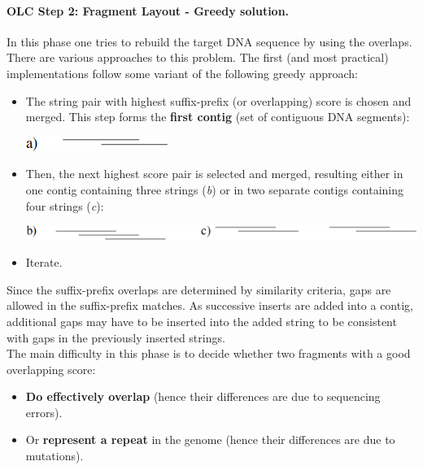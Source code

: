 \paragraph*{OLC Step 2: Fragment Layout - Greedy solution.} In this phase one tries to rebuild the target DNA sequence by using the overlaps. There are various approaches to this problem. The first (and most practical) implementations follow some variant of the following greedy approach:
\begin{itemize}
	\item The string pair with highest suffix-prefix (or overlapping) score is chosen and merged. This step forms the \textbf{first contig} (set of contiguous DNA segments):
	\begin{center}
		\includegraphics[width=0.22\columnwidth]{img/contigA}
	\end{center}
	\item Then, the next highest score pair is selected and merged, resulting either in one contig containing three strings (\textit{b}) or in two separate contigs containing four strings (\textit{c}):
	\begin{center}
		\includegraphics[width=0.8\columnwidth]{img/contigBC}
	\end{center}
	\item Iterate. 
\end{itemize} 
Since the suffix-prefix overlaps are determined by similarity criteria, gaps are allowed in the suffix-prefix matches. As successive inserts are added into a contig, additional gaps may have to be inserted into the added string to be consistent with gaps in the previously inserted strings.\\
The main difficulty in this phase is to decide whether two fragments with a good overlapping score:
\begin{itemize}
	\item \textbf{Do effectively overlap} (hence their differences are due to sequencing errors).
	\item Or \textbf{represent a repeat} in the genome (hence their differences are due to mutations).
\end{itemize}

